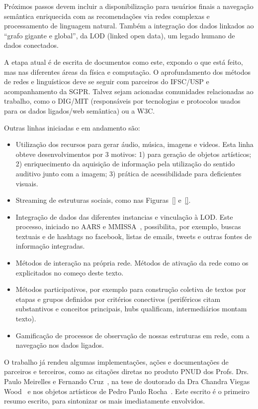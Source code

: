 \documentclass[a4paper, 11pt]{article} %
\begin{document}
Próximos passos devem incluir a disponibilização para usuários finais a navegação semântica enriquecida com as recomendações via redes complexas e processamento de linguagem natural. Também a integração dos dados linkados ao ``grafo gigante e global'', da LOD (linked open data), um legado humano de dados conectados.

A etapa atual é de escrita de documentos como este, expondo o que está feito, mas nas diferentes áreas da física e computação. O aprofundamento dos métodos de redes e linguísticos deve se seguir com parceiros do IFSC/USP e acompanhamento da SGPR. Talvez sejam acionadas comunidades relacionadas ao trabalho, como o DIG/MIT (responsáveis por tecnologias e protocolos usados para os dados ligados/web semântica) ou a W3C.

Outras linhas iniciadas e em andamento são:
\begin{itemize}
\item Utilização dos recursos para gerar áudio, música, imagens e videos. Esta linha obteve desenvolvimentos por 3 motivos: 1) para geração de objetos artísticos; 2) enriquecimento da aquisição de informação pela utilização do sentido auditivo junto com a imagem; 3) prática de acessibilidade para deficientes visuais.
\item Streaming de estruturas sociais, como nas Figuras~\ref{} e~\ref{}.
\item Integração de dados das diferentes instancias e vinculação à LOD. Este processo, iniciado no AARS e MMISSA~\cite{aars,mmissa}, possibilita, por exemplo, buscas textuais e de hashtags no facebook, listas de emails, tweets e outras fontes de informação integradas.
\item Métodos de interação na própria rede. Métodos de ativação da rede como os explicitados no começo deste texto.
\item Métodos participativos, por exemplo para construção coletiva de textos por etapas e grupos definidos por critérios conectivos (periféricos citam substantivos e conceitos principais, hubs qualificam, intermediários montam texto).
\item Gamificação de processos de observação de nossas estruturas em rede, com a navegação nos dados ligados.
\end{itemize}

O trabalho já rendeu algumas implementações, ações e documentações de parceiros e terceiros, como as citações diretas no produto PNUD dos Profs. Drs. Paulo Meirelles e Fernando Cruz~\cite{paulo6}, na tese de doutorado da Dra Chandra Viegas Wood~\cite{chandra} e nos objetos artísticos de Pedro Paulo Rocha~\cite{pedro}. Este escrito é o primeiro resumo escrito, para sintonizar os mais imediatamente envolvidos.






\end{document}
